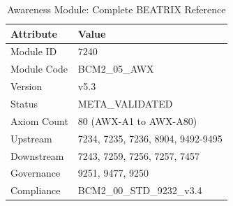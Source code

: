 \begin{table}[htbp]
\centering
\caption{Awareness Module: Complete BEATRIX Reference}
\label{tab:beatrix-summary}
\renewcommand{\arraystretch}{1.3}
\begin{tabular}{@{}ll@{}}
\toprule
\textbf{Attribute} & \textbf{Value} \\
\midrule
Module ID & 7240 \\
Module Code & BCM2\_05\_AWX \\
Version & v5.3 \\
Status & META\_VALIDATED \\
Axiom Count & 80 (AWX-A1 to AWX-A80) \\
Upstream & 7234, 7235, 7236, 8904, 9492-9495 \\
Downstream & 7243, 7259, 7256, 7257, 7457 \\
Governance & 9251, 9477, 9250 \\
Compliance & BCM2\_00\_STD\_9232\_v3.4 \\
\bottomrule
\end{tabular}
\end{table}

